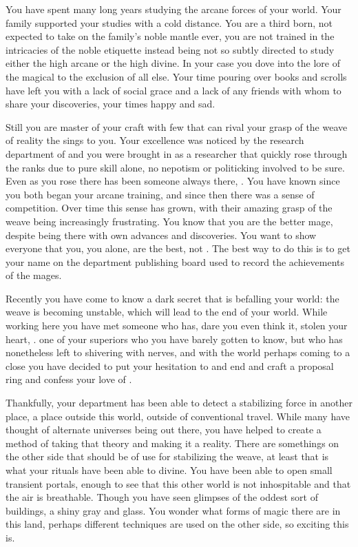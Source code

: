 \documentclass[char]{guildcamp3}
\begin{document}
\name{\cMageOne{}}


You have spent many long years studying the arcane forces of your world. Your family supported your studies with a cold distance. You are a third born, not expected to take on the family's noble mantle ever, you are not trained in the intricacies of the noble etiquette instead being not so subtly directed to study either the high arcane or the high divine. In your case you dove into the lore of the magical to the exclusion of all else. Your time pouring over books and scrolls have left you with a lack of social grace and a lack of any friends with whom to share your discoveries, your times happy and sad. 

Still you are master of your craft with few that can rival your grasp of the weave of reality the sings to you. Your excellence was noticed by the research department of \bMagicWorld{} and you were brought in as a researcher that quickly rose through the ranks due to pure skill alone, no nepotism or politicking involved to be sure. Even as you rose there has been someone always there, \cMageTwo{\intro}. You have known \cMageTwo{\them} since you both began your arcane training, and since then there was a sense of competition. Over time this sense has grown, with their amazing grasp of the weave being increasingly frustrating. You know that you are the better mage, despite \cMageTwo{\them} being there with \cMageTwo{\their} own advances and discoveries. You want to show everyone that you, you alone, are the best, not \cMageTwo{\them}. The best way to do this is to get your name on the department publishing board used to record the achievements of the mages. 

Recently you have come to know a dark secret that is befalling your world: the weave is becoming unstable, which will lead to the end of your world. While working here you have met someone who has, dare you even think it, stolen your heart, \cNobleOne{\intro}. one of your superiors who you have barely gotten to know, but who has nonetheless left to shivering with nerves, and with the world perhaps coming to a close you have decided to put your hesitation to and end and craft a proposal ring and confess your love of \cNobleOne{\informal}.

Thankfully, your department has been able to detect a stabilizing force in another place, a place outside this world, outside of conventional travel. While many have thought of alternate universes being out there, you have helped to create a method of taking that theory and making it a reality. There are somethings on the other side that should be of use for stabilizing the weave, at least that is what your rituals have been able to divine. You have been able to open small transient portals, enough to see that this other world is not inhospitable and that the air is breathable. Though you have seen glimpses of the oddest sort of buildings, a shiny gray and glass. You wonder what forms of magic there are in this land, perhaps different techniques are used on the other side, so exciting this is.
\end{document}
